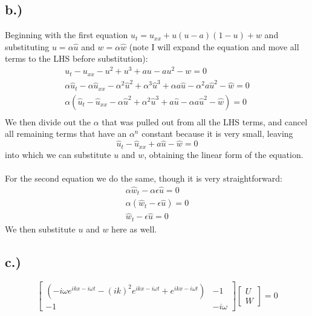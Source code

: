 \documentclass{article}
\begin{document}
\subsection*{b.)}
Beginning with the first equation $u_t = u_{xx} + u(u - a)(1-u) + w$ and substituting $u = \alpha\hat{u}$ and $w = \alpha\hat{w}$ (note I will expand the equation and move all terms to the LHS before substitution):
\begin{equation}
\begin{aligned}
u_t - u_{xx} - u^2 + u^3 + au - au^2 - w = 0\\
\alpha\hat{u}_t - \alpha\hat{u}_{xx} - \alpha^2\hat{u}^2 + \alpha^3\hat{u}^3 + \alpha a\hat{u} - \alpha^2 a\hat{u}^2 - \hat{w} = 0\\
\alpha (\hat{u}_t - \hat{u}_{xx} - \alpha\hat{u}^2 + \alpha^2\hat{u}^3 +  a\hat{u} - \alpha a\hat{u}^2 - \hat{w}) = 0\\
\end{aligned}
\end{equation}
We then divide out the $\alpha$ that was pulled out from all the LHS terms, and cancel all remaining terms that have an $\alpha^n$ constant because it is very small, leaving
\begin{equation}
\hat{u}_t - \hat{u}_{xx} + a\hat{u} - \hat{w} = 0
\end{equation}
into which we can substitute $u$ and $w$, obtaining the linear form of the equation.\\
\\
For the second equation we do the same, though it is very straightforward:
\begin{equation}
\begin{aligned}
\alpha\hat{w}_t - \alpha\epsilon\hat{u} = 0\\
\alpha(\hat{w}_t - \epsilon\hat{u}) = 0\\
\hat{w}_t - \epsilon\hat{u} = 0
\end{aligned}
\end{equation}
We then substitute $u$ and $w$ here as well.
\subsection*{c.)}
\[
\begin{bmatrix}
(-i\omega e^{ikx - i\omega t} - (ik)^2e^{ikx - i\omega t} + e^{ikx - i\omega t}) & -1\\
-1 & -i\omega
\end{bmatrix}
\begin{bmatrix}
U\\
W
\end{bmatrix}
= 0
\]
\end{document}
